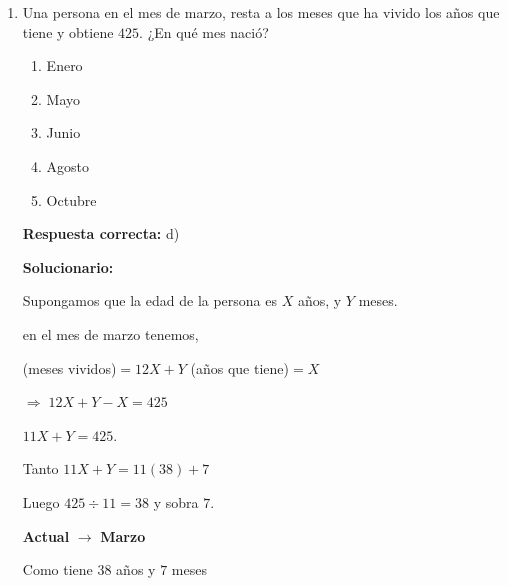 \begin{enumerate}[resume]

\item Una persona en el mes de marzo, resta a los meses que ha vivido los años que tiene y obtiene $425$. ¿En qué mes nació?
\begin{enumerate}[label=\alph*)]
	\item Enero
	\item Mayo
	\item Junio
	\item Agosto
	\item Octubre
\end{enumerate}

\textbf{Respuesta correcta:} d)

\vspace{2mm}
\textbf{Solucionario:}

Supongamos que la edad de la persona es
$X$ años, y $Y$ meses.

en el mes de marzo tenemos,

(meses vividos)$=12X+Y$
(años que tiene)$=X$

$\Rightarrow\; 12X+Y-X=425$

$11X+Y=425.$

Tanto \quad $11X+Y=11(38)+7$

Luego \quad $425 \div 11 = 38$ \quad y sobra $7$.

\textbf{Actual} $\rightarrow$ \textbf{Marzo}

Como tiene $38$ años y $7$ meses

\end{enumerate}
